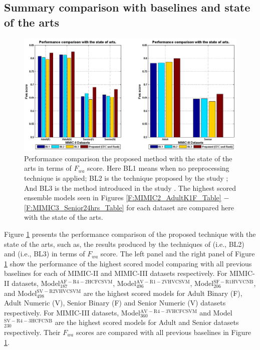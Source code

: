 \subsection{Summary comparison with baselines and state of the arts}

\begin{figure}[h] 
	\includegraphics[scale=0.5]{fig/comparison-with-state-of-arts.png}
	\centering \caption{Performance comparison the proposed method with the state of the arts in terms of $F_{wa}$ score. Here BL1 means when no preprocessing technique is applied; BL2 is the technique proposed by the study \cite{mehedy-masud:2017:fvc}; And BL3 is the method introduced in the study \cite{mehedy-masud:2018:frmwrk}. The highest scored ensemble models seen in Figures \ref{F:MIMIC2_AdultK1F_Table} $-$ \ref{F:MIMIC3_Senior24hrs_Table} for each dataset are compared here with the state of the arts.}
	\label{F:comparison_with_state_of_art}
\end{figure}

%
%

Figure \ref{F:comparison_with_state_of_art} presents the performance comparison of the proposed technique with the state of the arts, such as, the results produced by the techniques of \cite{mehedy-masud:2017:fvc} (i.e., BL2) and \cite{mehedy-masud:2018:frmwrk} (i.e., BL3) in terms of $F_{wa}$ score. The left panel and the right panel of Figure \ref{F:comparison_with_state_of_art} show the performance of the highest scored model comparing with all previous baselines for each of MIMIC-II and MIMIC-III datasets respectively. For MIMIC-II datasets, Model$_\mathrm{187}^\mathrm{AF-R4-2HCFCSVM}$, Model$_\mathrm{496}^\mathrm{AV-R1-2VHVCSVM}$, Model$_\mathrm{206}^\mathrm{SF-R1HVVCNB}$, and Model$_\mathrm{498}^\mathrm{SV-R2VHVCSVM}$ are the highest scored models for Adult Binary (F), Adult Numeric (V), Senior Binary (F) and Senior Numeric (V) datasets respectively. For MIMIC-III datasets, Model$_\mathrm{360}^\mathrm{AV-R4-3VHCFCSVM}$ and Model$_\mathrm{230}^\mathrm{SV-R4-3HCFCNB}$ are the highest scored models for Adult and Senior datasets respectively. Their $F_{wa}$ scores are compared with all previous baselines in Figure \ref{F:comparison_with_state_of_art}. 

